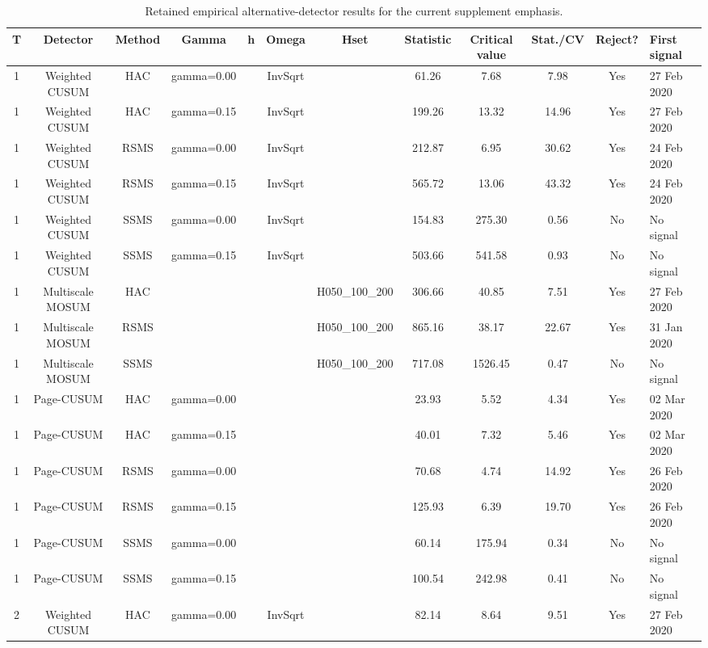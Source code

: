 \begin{table}[htbp]
\centering
\scriptsize
\caption{Retained empirical alternative-detector results for the current supplement emphasis.}
\label{tab:bundle-empirical-alt-retained}
\begin{tabular}{cccccccccccl}
\toprule
T & Detector & Method & Gamma & h & Omega & Hset & Statistic & Critical value & Stat./CV & Reject? & First signal \\
\midrule
1 & Weighted CUSUM & HAC & gamma=0.00 &  & InvSqrt &  & 61.26 & 7.68 & 7.98 & Yes & 27 Feb 2020 \\
1 & Weighted CUSUM & HAC & gamma=0.15 &  & InvSqrt &  & 199.26 & 13.32 & 14.96 & Yes & 27 Feb 2020 \\
1 & Weighted CUSUM & RSMS & gamma=0.00 &  & InvSqrt &  & 212.87 & 6.95 & 30.62 & Yes & 24 Feb 2020 \\
1 & Weighted CUSUM & RSMS & gamma=0.15 &  & InvSqrt &  & 565.72 & 13.06 & 43.32 & Yes & 24 Feb 2020 \\
1 & Weighted CUSUM & SSMS & gamma=0.00 &  & InvSqrt &  & 154.83 & 275.30 & 0.56 & No & No signal \\
1 & Weighted CUSUM & SSMS & gamma=0.15 &  & InvSqrt &  & 503.66 & 541.58 & 0.93 & No & No signal \\
1 & Multiscale MOSUM & HAC &  &  &  & H050_100_200 & 306.66 & 40.85 & 7.51 & Yes & 27 Feb 2020 \\
1 & Multiscale MOSUM & RSMS &  &  &  & H050_100_200 & 865.16 & 38.17 & 22.67 & Yes & 31 Jan 2020 \\
1 & Multiscale MOSUM & SSMS &  &  &  & H050_100_200 & 717.08 & 1526.45 & 0.47 & No & No signal \\
1 & Page-CUSUM & HAC & gamma=0.00 &  &  &  & 23.93 & 5.52 & 4.34 & Yes & 02 Mar 2020 \\
1 & Page-CUSUM & HAC & gamma=0.15 &  &  &  & 40.01 & 7.32 & 5.46 & Yes & 02 Mar 2020 \\
1 & Page-CUSUM & RSMS & gamma=0.00 &  &  &  & 70.68 & 4.74 & 14.92 & Yes & 26 Feb 2020 \\
1 & Page-CUSUM & RSMS & gamma=0.15 &  &  &  & 125.93 & 6.39 & 19.70 & Yes & 26 Feb 2020 \\
1 & Page-CUSUM & SSMS & gamma=0.00 &  &  &  & 60.14 & 175.94 & 0.34 & No & No signal \\
1 & Page-CUSUM & SSMS & gamma=0.15 &  &  &  & 100.54 & 242.98 & 0.41 & No & No signal \\
2 & Weighted CUSUM & HAC & gamma=0.00 &  & InvSqrt &  & 82.14 & 8.64 & 9.51 & Yes & 27 Feb 2020 \\

\end{tabular}
\end{table}
